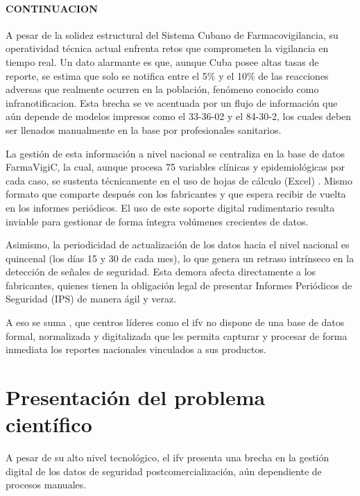 \paragraph{CONTINUACION}
A pesar de la solidez estructural del Sistema Cubano de Farmacovigilancia, su operatividad técnica actual enfrenta retos que comprometen la vigilancia en tiempo real. 
Un dato alarmante es que, aunque Cuba posee altas tasas de reporte, se estima que solo se notifica entre el 5\% y el 10\% de las reacciones adversas que realmente ocurren en la población, fenómeno conocido como \gls{infranotificacion}\cite{tarrago_farmacovigilancia_cuba_2019}.
Esta brecha se ve acentuada por un flujo de información que aún depende de modelos impresos como el 33-36-02 y el 84-30-2, los cuales deben ser llenados manualmente en la base por profesionales sanitarios.

La gestión de esta información a nivel nacional se centraliza en la base de datos \gls{FarmaVigiC}, la cual, aunque procesa 75 variables clínicas y epidemiológicas por cada caso, se sustenta técnicamente en el uso de hojas de cálculo (Excel) \cite{normas_farmacovigilancia_cuba_2012}. 
Mismo formato que comparte después con los fabricantes y que espera recibir de vuelta en los informes periódicos.
El uso de este soporte digital rudimentario resulta inviable para gestionar de forma íntegra volúmenes crecientes de datos.

Asimismo, la periodicidad de actualización de los datos hacia el nivel nacional es quincenal (los días 15 y 30 de cada mes), lo que genera un retraso intrínseco en la detección de señales de seguridad. 
Esta demora afecta directamente a los fabricantes, quienes tienen la obligación legal de presentar Informes Periódicos de Seguridad (IPS) de manera ágil y veraz. 

A eso se suma , que centros líderes como el \gls{ifv} no dispone de una base de datos formal, normalizada y digitalizada que les permita capturar y procesar de forma inmediata los reportes nacionales vinculados a sus productos.




\section{Presentación del problema científico}\label{section:presentacionProblema}

A pesar de su alto nivel tecnológico, el \gls{ifv} presenta una brecha en la gestión digital de los datos de seguridad postcomercialización, aún dependiente de procesos manuales. 

